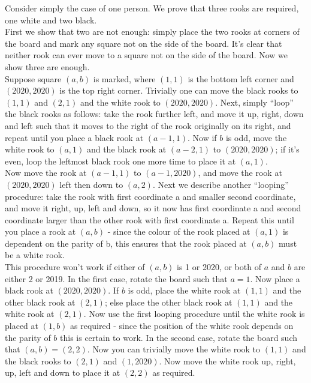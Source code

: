 \documentclass[titlepage=true]{scrartcl}
\begin{document}
    \begin{solution} \hfil\medskip

        Consider simply the case of one person. We prove that three rooks are required, one white and two black.\\
        
        First we show that two are not enough: simply place the two rooks at corners of the board and mark any square not on the side of the board. It’s clear that neither rook can ever move to a square not on the side of the board. 
        Now we show three are enough.\\
        
        Suppose square \((a, b)\) is marked, where \((1, 1)\) is the bottom left corner and \((2020, 2020)\) is the top right corner.
        Trivially one can move the black rooks to \((1, 1)\) and \((2, 1)\) and the white rook to \((2020, 2020)\). 
        Next, simply “loop” the black rooks as follows: take the rook further left, and move it up, right, down and left such that it moves to the right of the rook originally on its right, and repeat until you place a black rook at \((a - 1, 1)\). Now if \(b\) is odd, move the white rook to \((a, 1)\) and the black rook at \((a - 2, 1)\) to \((2020, 2020)\); if it’s even, loop the leftmost black rook one more time to place it at \((a, 1)\).\\
        
        Now move the rook at \((a - 1, 1)\) to \((a - 1, 2020)\), and move the rook at \((2020, 2020)\) left then down to \((a, 2)\). Next we describe another “looping” procedure: take the rook with first coordinate a and smaller second coordinate, and move it right, up, left and down, so it now has first coordinate a and second coordinate larger than the other rook with first coordinate a. Repeat this until you place a rook at \((a, b)\) - since the colour of the rook placed at \((a, 1)\) is dependent on the parity of b, this ensures that the rook placed at \((a, b)\) must be a white rook.\\
        
        This procedure won’t work if either of \((a, b)\) is 1 or 2020, or both of \(a\) and \(b\) are either 2 or 2019. 
        In the first case, rotate the board such that \(a = 1\). Now place a black rook at \((2020, 2020)\). If \(b\) is odd, place the white rook at \((1, 1)\) and the other black rook at \((2, 1)\); else place the other black rook at \((1, 1)\) and the white rook at \((2, 1)\). Now use the first looping procedure until the white rook is placed at \((1, b)\) as required - since the position of the white rook depends on the parity of \(b\) this is certain to work. In the second case, rotate the board such that \((a, b) = (2, 2)\). Now you can trivially move the white rook to \((1, 1)\) and the black rooks to \((2, 1)\) and \((1, 2020)\). Now move the white rook up, right, up, left and down to place it at \((2, 2)\) as required.\\
        

\end{solution}
\end{document}

